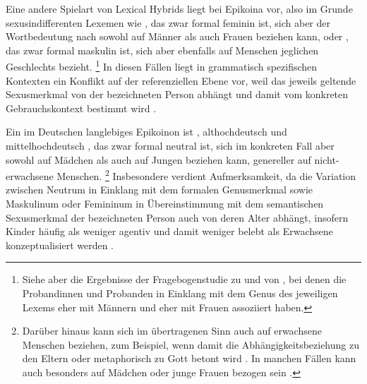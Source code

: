 Eine andere Spielart von Lexical Hybrids liegt bei Epikoina vor, also im Grunde
sexus\-indifferenten Lexemen wie , das zwar formal feminin ist, sich
aber der Wortbedeutung nach sowohl auf Männer als auch Frauen beziehen kann,
oder , das zwar formal maskulin ist, sich aber ebenfalls auf
Menschen jeglichen Geschlechts bezieht.%
%
	\footnote{Siehe aber die Ergebnisse der Fragebogenstudie zu
		 und  von \citet[174--183]{klein2022}, bei denen
		die Probandinnen und Probanden in Einklang mit dem Genus des jeweiligen
		Lexems  eher mit Männern und  eher mit Frauen
		assoziiert haben.}
%
In diesen Fällen liegt in grammatisch spezifischen Kontexten ein Konflikt auf
der referenziellen Ebene vor, weil das jeweils geltende Sexusmerkmal von der
bezeichneten Person abhängt und damit vom konkreten Gebrauchskontext bestimmt
wird \autocite[142--144]{klein2022}.

Ein im Deutschen langlebiges Epikoinon ist , althochdeutsch
 und mittelhochdeutsch , das zwar formal neutral ist,
sich im konkreten Fall aber sowohl auf Mädchen als auch auf Jungen beziehen
kann, genereller auf nicht-erwachsene Menschen.%
%
	\footnote{Darüber hinaus kann sich  im übertragenen Sinn auch auf
		erwachsene Menschen beziehen, zum Beispiel, wenn damit die
		Abhängigkeitsbeziehung zu den Eltern oder metaphorisch zu Gott betont
		wird \autocite[s.\,v.~\textit{kint}]{lexer:mhdhwb}. In manchen Fällen
		kann  auch besonders auf Mädchen oder junge Frauen bezogen
		sein
		\autocites[s.\,v.~\textit{kint}]{drw}[s.\,v.~\textit{Kind}]{duden-online}.}
%
Insbesondere  verdient Aufmerksamkeit, da die Variation zwischen
Neutrum in Einklang mit dem formalen Genusmerkmal sowie Maskulinum oder
Femininum in Übereinstimmung mit dem semantischen Sexusmerkmal der bezeichneten
Person auch von deren Alter abhängt, insofern Kinder häufig als weniger agentiv
und damit weniger belebt als Erwachsene konzeptualisiert werden
\autocites[196]{comrie1989}[258--259]{birkenesfleischer2022}[151]{klein2022}.


